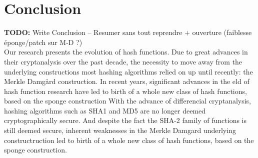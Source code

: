 \chapter*{Conclusion}

\textbf{TODO:} Write Conclusion -- Resumer sans tout reprendre + ouverture (faiblesse éponge/patch sur M-D ?)\\
Our research presents the evolution of hash functions. Due to great advances in their cryptanalysis over the past decade, the necessity to move away from the underlying constructions most  hashing algorithms relied on up until recently: the Merkle Damg\r{a}rd construction.
In recent years, significant advances in the  eld of hash function research have led to birth of a whole new class of hash functions, based on the sponge construction
With the advance of differencial cryptanalysis,  hashing algorithms such as SHA1 and MD5 are no longer deemed cryptographically secure.
And despite the fact the SHA-2 family of functions is still deemed secure, inherent weaknesses in the Merkle Damgard underlying constructruction led to birth of a whole new class of hash functions, based on the sponge construction.
